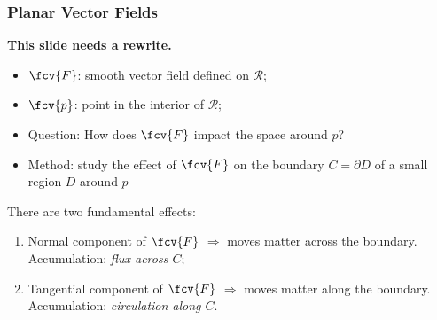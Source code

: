 \begin{frame}
\frametitle{Planar Vector Fields}

\textbf{This slide needs a rewrite.}
\begin{itemize}
\item $\fcv{F}$: smooth vector field defined on $\mathcal{R}$;
\item $\fcv{p}$: point in the interior of $\mathcal{R}$;
\item Question: How does $\fcv{F}$ impact the space around $p$?
\item \pause Method: study the effect of $\fcv{F}$ on the boundary $C =\partial D$ of a small region $D$ around $p$
\end{itemize}
\pause There are two fundamental effects:

\begin{enumerate}
  \item \pause Normal component of $\fcv{F}$ $\Longrightarrow$ moves matter across the boundary. Accumulation: \emph{flux across $C$};

  \item \pause Tangential component of $\fcv{F}$ $\Longrightarrow$ moves matter along the boundary. Accumulation: \emph{circulation along $C$}.
\end{enumerate}

\end{frame}